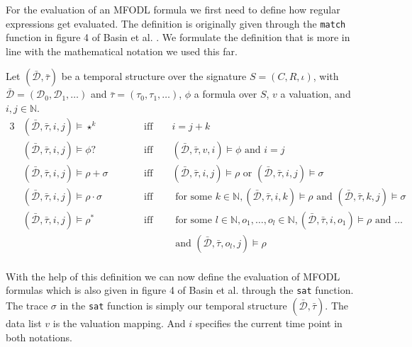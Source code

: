 For the evaluation of an MFODL formula we first need to define how regular expressions get evaluated.
The definition is originally given through the \texttt{match} function in figure 4 of Basin et al. \cite{Basin2020}.
We formulate the definition that is more in line with the mathematical notation we used this far.
\begin{definition}
    Let $(\bar{\mathcal{D}}, \bar{\tau})$ be a temporal structure over the signature $S = (C,R,\iota)$, with $\bar{\mathcal{D}} = (\mathcal{D}_0,\mathcal{D}_1,\dots)$ and $\bar{\tau} = (\tau_0, \tau_1, \dots)$, $\phi$ a formula over $S$, $v$ a valuation, and $i,j \in \mathbb{N}$.
    \begin{alignat*}{3}
        &(\bar{\mathcal{D}}, \bar{\tau}, i, j) \models \star^k
            &&\text{iff } && i = j + k\\
        &(\bar{\mathcal{D}}, \bar{\tau}, i, j) \models \phi ?
            &&\text{iff } && (\bar{\mathcal{D}}, \bar{\tau}, v, i) \models \phi \text{ and } i = j\\
        &(\bar{\mathcal{D}}, \bar{\tau}, i, j) \models \rho + \sigma \qquad
            &&\text{iff } && (\bar{\mathcal{D}}, \bar{\tau}, i, j) \models \rho \text{ or }(\bar{\mathcal{D}}, \bar{\tau}, i, j) \models \sigma \\
        &(\bar{\mathcal{D}}, \bar{\tau}, i, j) \models \rho \cdot \sigma \qquad
            &&\text{iff } && \text{ for some } k \in \mathbb{N}, (\bar{\mathcal{D}}, \bar{\tau}, i, k) \models \rho \text{ and }(\bar{\mathcal{D}}, \bar{\tau}, k, j) \models \sigma \\
        &(\bar{\mathcal{D}}, \bar{\tau}, i, j) \models \rho^*
            &&\text{iff } && \text{ for some } l \in \mathbb{N}, o_1,\dots,o_l \in \mathbb{N}, (\bar{\mathcal{D}}, \bar{\tau}, i, o_1) \models \rho \text{ and } \dots  \\
            &&&&&\text{ and } (\bar{\mathcal{D}}, \bar{\tau}, o_l, j) \models \rho \\
    \end{alignat*}
    
\end{definition}
With the help of this definition we can now define the evaluation of MFODL formulas which is also given in figure 4 of Basin et al. \cite{Basin2020} through the \texttt{sat} function.
The trace $\sigma$ in the \texttt{sat} function is simply our temporal structure $(\bar{\mathcal{D}},\bar{\tau})$.
The data list $v$ is the valuation mapping.
And $i$ specifies the current time point in both notations.
